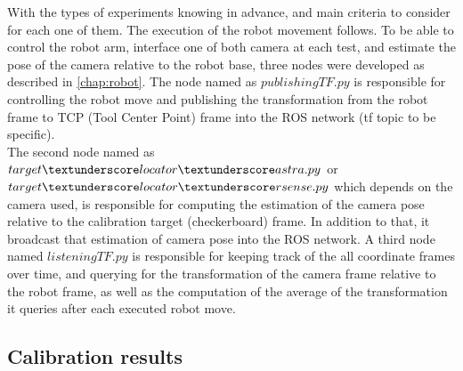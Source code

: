 With the types of experiments knowing in advance, and main criteria to consider for each one of them. The execution of the robot movement follows. To be able to control the robot arm, interface one of both camera at each test, and estimate the pose of the camera relative to the robot base, three nodes were developed as described in \ref{chap:robot}. The node named as $publishingTF.py$ is responsible for controlling the robot move and publishing the transformation from the robot frame to TCP (Tool Center Point) frame into the ROS network (tf topic to be specific). \\
The second node named as $target\textunderscore locator \textunderscore astra.py$ or $target\textunderscore locator \textunderscore rsense.py$  which depends on the camera used, is responsible  for computing the estimation of the camera pose relative to the calibration target (checkerboard) frame. In addition to that, it broadcast that estimation of camera pose into the ROS network. A third node named $listeningTF.py$ is responsible for keeping track of the all coordinate frames over time, and querying for the transformation of the camera frame relative to the robot frame, as well as the computation of the average of the transformation it queries after each executed robot move. 

\subsection{Calibration results}



